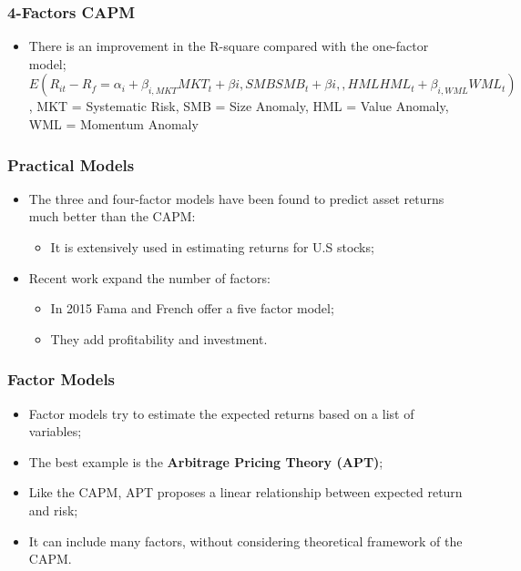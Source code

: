 \documentclass[11pt,a4paper]{report}
\begin{document}
\subsubsection{4-Factors CAPM}
    \begin{itemize}
    \item There is an improvement in the R-square compared with the one-factor model;
    \[E(R_{it} - R_f = \alpha_i + \beta_{i,MKT}MKT_t + \beta{i,SMB} SMB_t + \beta{i,,HML} HML_t + \beta_{i,WML}WML_t)\] , MKT = Systematic Risk, SMB = Size Anomaly, HML = Value Anomaly, WML = Momentum Anomaly
    \end{itemize}
\subsubsection{Practical Models}
\begin{itemize}
    \item The three and four-factor models have been found to predict asset returns much better than the CAPM:
    \begin{itemize}
        \item It is extensively used in estimating returns for U.S stocks;
    \end{itemize}
    \item Recent work expand the number of factors:
    \begin{itemize}
        \item In 2015 Fama and French offer a five factor model;
        \item They add profitability and investment.
    \end{itemize}
\end{itemize}
\subsubsection{Factor Models}
\begin{itemize}
    \item Factor models try to estimate the expected returns based on a list of variables;
    \item The best example is the \textbf{Arbitrage Pricing Theory (APT)};
    \item Like the CAPM, APT proposes a linear relationship between expected return and risk;
    \item It can include many factors, without considering theoretical framework of the CAPM.
\end{itemize}
\end{document}
